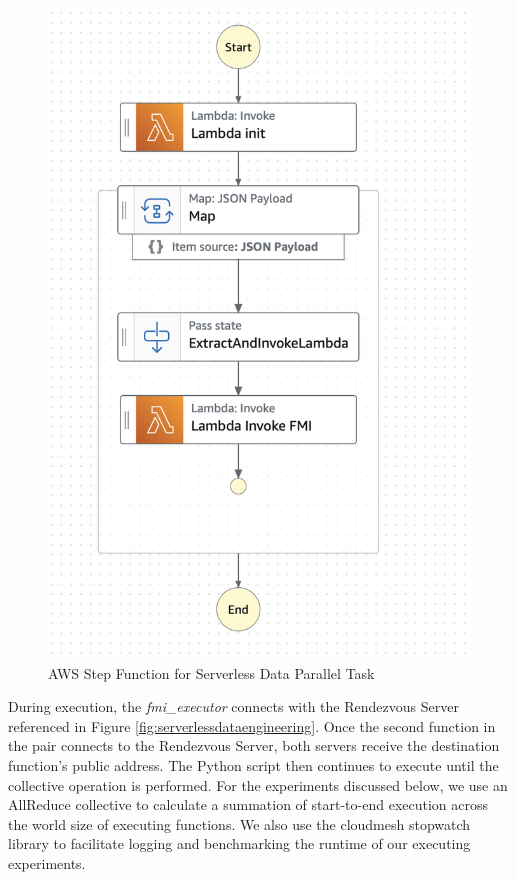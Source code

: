 \begin{figure}[ht]
    \begin{center}
    \includegraphics[width=\linewidth]{source/Figure/FMIStateMachine.png}
    \end{center}
    \caption{AWS Step Function for Serverless Data Parallel Task}
    \label{fig:fmistatemachine}
\end{figure}


During execution, the \textit{fmi\_executor} connects with the Rendezvous Server referenced in Figure \ref{fig:serverlessdataengineering}.  Once the second function in the pair connects to the Rendezvous Server, both servers receive the destination function's public address.  The Python script then continues to execute until the collective operation is performed.  For the experiments discussed below, we use an AllReduce collective to calculate a summation of start-to-end execution across the world size of executing functions.  We also use the cloudmesh stopwatch library to facilitate logging and benchmarking the runtime of our executing experiments.